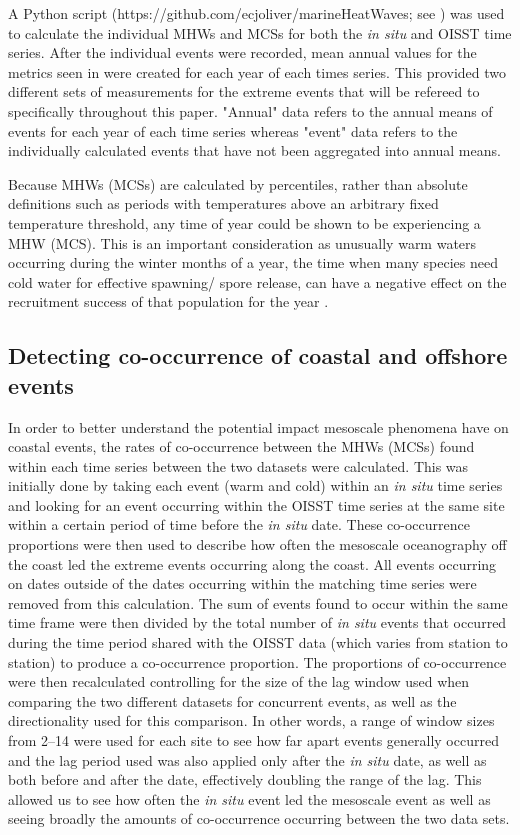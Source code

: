 \documentclass[a4paper,10pt,review]{elsarticle}
\begin{document}
A Python script (https://github.com/ecjoliver/marineHeatWaves; see \citet{Hobday2016}) was used to calculate the individual MHWs and MCSs for both the \emph{in situ} and OISST time series. After the individual events were recorded, mean annual values for the metrics seen in  were created for each year of each times series. This provided two different sets of measurements for the extreme events that will be refereed to specifically throughout this paper. "Annual" data refers to the annual means of events for each year of each time series whereas "event" data refers to the individually calculated events that have not been aggregated into annual means.

Because MHWs (MCSs) are calculated by percentiles, rather than absolute definitions such as periods with temperatures above an arbitrary fixed temperature threshold, any time of year could be shown to be experiencing a MHW (MCS). This is an important consideration as unusually warm waters occurring during the winter months of a year, the time when many species need cold water for effective spawning/ spore release, can have a negative effect on the recruitment success of that population for the year \citep{Wernberg2011}.

\subsection{Detecting co-occurrence of coastal and offshore events}
In order to better understand the potential impact mesoscale phenomena have on coastal events, the rates of co-occurrence between the MHWs (MCSs) found within each time series between the two datasets were calculated. This was initially done by taking each event (warm and cold) within an \emph{in situ} time series and looking for an event occurring within the OISST time series at the same site within a certain period of time before the \emph{in situ} date. These co-occurrence proportions were then used to describe how often the mesoscale oceanography off the coast led the extreme events occurring along the coast. All events occurring on dates outside of the dates occurring within the matching time series were removed from this calculation. The sum of events found to occur within the same time frame were then divided by the total number of \emph{in situ} events that occurred during the time period shared with the OISST data (which varies from station to station) to produce a co-occurrence proportion. The proportions of co-occurrence were then recalculated controlling for the size of the lag window used when comparing the two different datasets for concurrent events, as well as the directionality used for this comparison. In other words, a range of window sizes from 2--14 were used for each site to see how far apart events generally occurred and the lag period used was also applied only after the \emph{in situ} date, as well as both before and after the date, effectively doubling the range of the lag. This allowed us to see how often the \emph{in situ} event led the mesoscale event as well as seeing broadly the amounts of co-occurrence occurring between the two data sets.
\end{document}
